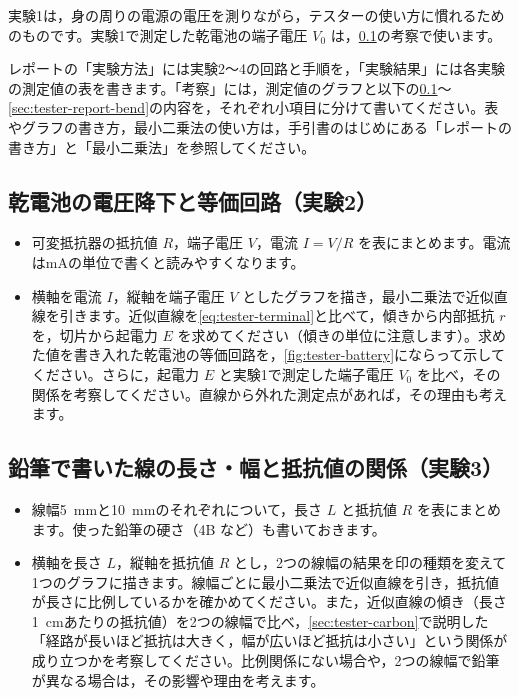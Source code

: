 実験1は，身の周りの電源の電圧を測りながら，テスターの使い方に慣れるためのものです。実験1で測定した乾電池の端子電圧 $V_0$ は，\cref{sec:tester-report-battery}の考察で使います。

レポートの「実験方法」には実験2〜4の回路と手順を，「実験結果」には各実験の測定値の表を書きます。「考察」には，測定値のグラフと以下の\cref{sec:tester-report-battery}〜\cref{sec:tester-report-bend}の内容を，それぞれ小項目に分けて書いてください。表やグラフの書き方，最小二乗法の使い方は，手引書のはじめにある「レポートの書き方」と「最小二乗法」を参照してください。

\subsection{乾電池の電圧降下と等価回路（実験2）}
\label{sec:tester-report-battery}

\begin{itemize}
  \item {}可変抵抗器の抵抗値 $R$，端子電圧 $V$，電流 $I=V/R$ を表にまとめます。電流は\si{mA}の単位で書くと読みやすくなります。
  \item {}横軸を電流 $I$，縦軸を端子電圧 $V$ としたグラフを描き，最小二乗法で近似直線を引きます。近似直線を\cref{eq:tester-terminal}と比べて，傾きから内部抵抗 $r$ を，切片から起電力 $E$ を求めてください（傾きの単位に注意します）。求めた値を書き入れた乾電池の等価回路を，\cref{fig:tester-battery}にならって示してください。さらに，起電力 $E$ と実験1で測定した端子電圧 $V_0$ を比べ，その関係を考察してください。直線から外れた測定点があれば，その理由も考えます。
\end{itemize}

\subsection{鉛筆で書いた線の長さ・幅と抵抗値の関係（実験3）}
\label{sec:tester-report-pencil}

\begin{itemize}
  \item {}線幅\SI{5}{mm}と\SI{10}{mm}のそれぞれについて，長さ $L$ と抵抗値 $R$ を表にまとめます。使った鉛筆の硬さ（4B など）も書いておきます。
  \item {}横軸を長さ $L$，縦軸を抵抗値 $R$ とし，2つの線幅の結果を印の種類を変えて1つのグラフに描きます。線幅ごとに最小二乗法で近似直線を引き，抵抗値が長さに比例しているかを確かめてください。また，近似直線の傾き（長さ\SI{1}{cm}あたりの抵抗値）を2つの線幅で比べ，\cref{sec:tester-carbon}で説明した「経路が長いほど抵抗は大きく，幅が広いほど抵抗は小さい」という関係が成り立つかを考察してください。比例関係にない場合や，2つの線幅で鉛筆が異なる場合は，その影響や理由を考えます。
\end{itemize}


